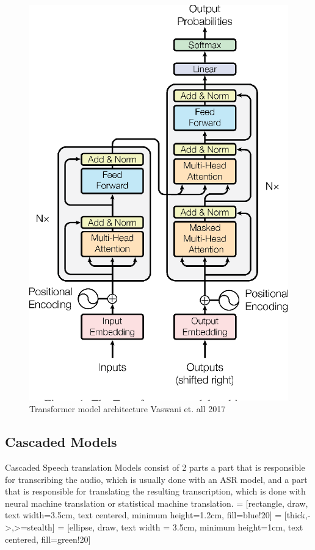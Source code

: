 \begin{figure}
        \centering
        \includegraphics[width=0.5\linewidth]{Latex//sections//images/transformermodel.png}
        \caption{Transformer model architecture Vaswani et. all 2017}
        \label{fig:enter-label}
    \end{figure}

\subsection{Cascaded Models}
Cascaded Speech translation Models consist of 2 parts a part that is responsible for transcribing the audio, which is usually done with an ASR model, and a part that is responsible for translating the resulting transcription, which is done with neural machine translation or statistical machine translation. 
 = [rectangle, draw, text width=3.5cm, text centered, minimum height=1.2cm, fill=blue!20]
 = [thick,->,>=stealth]
 = [ellipse, draw, text width = 3.5cm, minimum height=1cm, text centered, fill=green!20]


